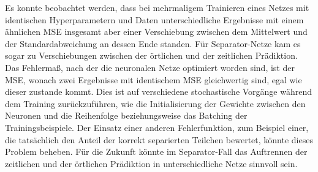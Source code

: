 Es konnte beobachtet werden, dass bei mehrmaligem Trainieren eines Netzes 
mit identischen Hyperparametern und Daten unterschiedliche Ergebnisse mit einem ähnlichen MSE insgesamt aber einer Verschiebung zwischen dem Mittelwert und der Standardabweichung  
an dessen Ende standen.
Für Separator-Netze kam es sogar zu Verschiebungen zwischen der örtlichen und der zeitlichen Prädiktion.
Das Fehlermaß, nach der die neuronalen Netze optimiert worden sind, ist der MSE, wonach zwei Ergebnisse mit identischem MSE gleichwertig sind, egal wie dieser zustande kommt.
Dies ist auf verschiedene stochastische Vorgänge während dem Training zurückzuführen, wie die Initialisierung der Gewichte zwischen den Neuronen und die Reihenfolge beziehungsweise das Batching der Trainingsbeispiele.
Der Einsatz einer anderen Fehlerfunktion, zum Beispiel einer, die tatsächlich den Anteil der korrekt separierten Teilchen bewertet, könnte dieses Problem beheben.
Für die Zukunft könnte im Separator-Fall das Auftrennen der zeitlichen und der örtlichen Prädiktion in unterschiedliche Netze sinnvoll sein.
